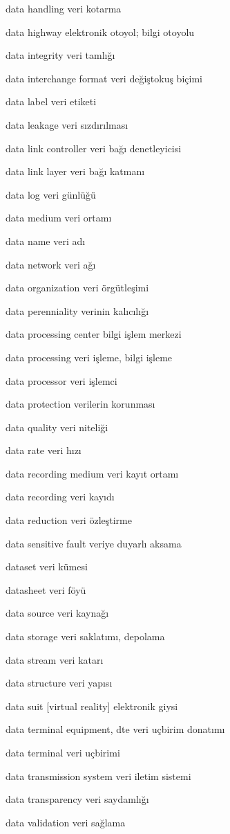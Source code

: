 \documentclass[12pt,fleqn]{article}\usepackage{../../common}
\begin{document}
data handling veri kotarma

data highway elektronik otoyol; bilgi otoyolu

data integrity veri tamlığı

data interchange format veri değiştokuş biçimi

data label veri etiketi

data leakage veri sızdırılması

data link controller veri bağı denetleyicisi

data link layer veri bağı katmanı

data log veri günlüğü

data medium veri ortamı

data name veri adı

data network veri ağı

data organization veri örgütleşimi

data perenniality verinin kalıcılığı

data processing center bilgi işlem merkezi

data processing veri işleme, bilgi işleme

data processor veri işlemci

data protection verilerin korunması

data quality veri niteliği

data rate veri hızı

data recording medium veri kayıt ortamı

data recording veri kayıdı

data reduction veri özleştirme

data sensitive fault veriye duyarlı aksama

dataset veri kümesi

datasheet veri föyü

data source veri kaynağı

data storage veri saklatımı, depolama

data stream veri katarı

data structure veri yapısı

data suit [virtual reality] elektronik giysi

data terminal equipment, dte veri uçbirim donatımı

data terminal veri uçbirimi

data transmission system veri iletim sistemi

data transparency veri saydamlığı

data validation veri sağlama
\end{document}
